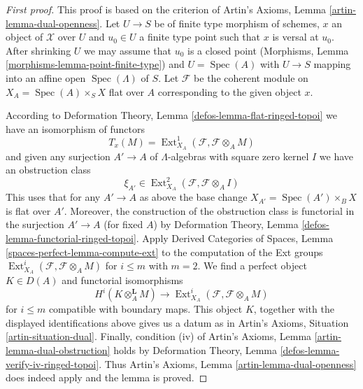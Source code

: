 \documentclass{stacks-project}
\theoremstyle{plain}
\theoremstyle{definition}
\theoremstyle{remark}
\numberwithin{equation}{subsection}
\def\Spec{\mathop{\mathrm{Spec}}}
\def\Ext{\mathop{\mathrm{Ext}}\nolimits}
\begin{document}
\begin{proof}[First proof]
This proof is based on the criterion of
Artin's Axioms, Lemma \ref{artin-lemma-dual-openness}.
Let $U \to S$ be of finite type morphism of schemes, $x$ an object of
$\mathcal{X}$ over $U$ and $u_0 \in U$ a finite type point such that
$x$ is versal at $u_0$. After shrinking $U$ we may assume that $u_0$
is a closed point (Morphisms, Lemma \ref{morphisms-lemma-point-finite-type})
and $U = \Spec(A)$ with $U \to S$ mapping into an
affine open $\Spec(\Lambda)$ of $S$.
Let $\mathcal{F}$ be the coherent module on $X_A = \Spec(A) \times_S X$
flat over $A$ corresponding to the given object $x$.

\medskip\noindent
According to Deformation Theory, Lemma \ref{defos-lemma-flat-ringed-topoi}
we have an isomorphism of functors
$$
T_x(M) = \Ext^1_{X_A}(\mathcal{F}, \mathcal{F} \otimes_A M)
$$
and given any surjection $A' \to A$ of $\Lambda$-algebras with square zero
kernel $I$ we have an obstruction class
$$
\xi_{A'} \in \Ext^2_{X_A}(\mathcal{F}, \mathcal{F} \otimes_A I)
$$
This uses that for any $A' \to A$ as above the base change
$X_{A'} = \Spec(A') \times_B X$ is flat over $A'$.
Moreover, the construction of the obstruction class is functorial
in the surjection $A' \to A$ (for fixed $A$) by
Deformation Theory, Lemma \ref{defos-lemma-functorial-ringed-topoi}.
Apply Derived Categories of Spaces, Lemma
\ref{spaces-perfect-lemma-compute-ext}
to the computation of the Ext groups
$\Ext^i_{X_A}(\mathcal{F}, \mathcal{F} \otimes_A M)$
for $i \leq m$ with $m = 2$. We find a perfect object $K \in D(A)$
and functorial isomorphisms
$$
H^i(K \otimes_A^\mathbf{L} M)
\longrightarrow
\Ext^i_{X_A}(\mathcal{F}, \mathcal{F} \otimes_A M)
$$
for $i \leq m$ compatible with boundary maps. This object $K$, together
with the displayed identifications above gives us a datum as in
Artin's Axioms, Situation \ref{artin-situation-dual}.
Finally, condition (iv) of
Artin's Axioms, Lemma \ref{artin-lemma-dual-obstruction}
holds by 
Deformation Theory, Lemma \ref{defos-lemma-verify-iv-ringed-topoi}.
Thus Artin's Axioms, Lemma \ref{artin-lemma-dual-openness}
does indeed apply and the lemma is proved.
\end{proof}
\end{document}

